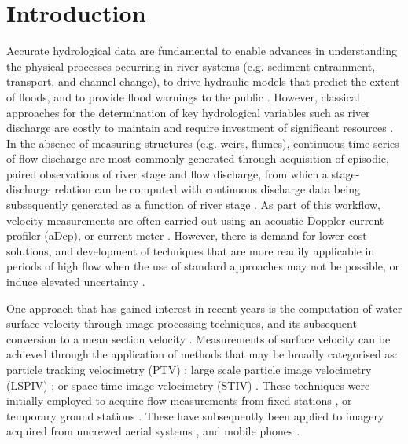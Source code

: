 \documentclass[hess, manuscript]{copernicus} %
\providecommand{\DIFadd}[1]{{\protect\color{blue}\uwave{#1}}} %
\providecommand{\DIFdel}[1]{{\protect\color{red}\sout{#1}}} %
\providecommand{\DIFaddbegin}{} %
\providecommand{\DIFaddend}{} %
\providecommand{\DIFdelbegin}{} %
\providecommand{\DIFdelend}{} %
\newcommand{\DIFscaledelfig}{0.5}
\newlength{\DIFdelgraphicswidth} %
\newlength{\DIFdelgraphicsheight} %
\newcommand{\DIFaddincludegraphics}[2][]{{\color{blue}\fbox{\DIFOincludegraphics[#1]{#2}}}} %
\newcommand{\DIFdelincludegraphics}[2][]{%
\sbox{\DIFdelgraphicsbox}{\DIFOincludegraphics[#1]{#2}}%
\settoboxwidth{\DIFdelgraphicswidth}{\DIFdelgraphicsbox} %
\settoboxtotalheight{\DIFdelgraphicsheight}{\DIFdelgraphicsbox} %
\scalebox{\DIFscaledelfig}{%
\parbox[b]{\DIFdelgraphicswidth}{\usebox{\DIFdelgraphicsbox}\\[-\baselineskip] \rule{\DIFdelgraphicswidth}{0em}}\llap{\resizebox{\DIFdelgraphicswidth}{\DIFdelgraphicsheight}{%
\setlength{\unitlength}{\DIFdelgraphicswidth}%
\begin{picture}(1,1)%
\thicklines\linethickness{2pt} %
{\color[rgb]{1,0,0}\put(0,0){\framebox(1,1){}}}%
{\color[rgb]{1,0,0}\put(0,0){\line( 1,1){1}}}%
{\color[rgb]{1,0,0}\put(0,1){\line(1,-1){1}}}%
\end{picture}%
}\hspace*{3pt}}} %
} %
\DeclareRobustCommand{\DIFaddbegin}{\DIFOaddbegin \let\includegraphics\DIFaddincludegraphics} %
\DeclareRobustCommand{\DIFaddend}{\DIFOaddend \let\includegraphics\DIFOincludegraphics} %
\DeclareRobustCommand{\DIFdelbegin}{\DIFOdelbegin \let\includegraphics\DIFdelincludegraphics} %
\DeclareRobustCommand{\DIFdelend}{\DIFOaddend \let\includegraphics\DIFOincludegraphics} %
\begin{document}
\section{Introduction}
Accurate hydrological data are fundamental to enable advances in understanding the physical processes occurring in river systems (e.g. sediment entrainment, transport, and channel change), to drive hydraulic models that predict the extent of floods, and to provide flood warnings to the public \citep{McMillan2017,Tauro2018}. However, classical approaches for the determination of key hydrological variables such as river discharge are costly to maintain and require investment of significant resources \citep{Fekete2007}. In the absence of measuring structures (e.g. weirs, flumes), continuous time-series of flow discharge are most commonly generated through acquisition of episodic, paired observations of river stage and flow discharge, from which a stage-discharge relation can be computed with continuous discharge data being subsequently generated as a function of river stage \citep{Kiang2018}. As part of this workflow, velocity measurements are often carried out using an acoustic Doppler current profiler (aDcp), or current meter \citep{Herschy2014}. However, there is demand for lower cost solutions, and development of techniques that are more readily applicable in periods of high flow when the use of standard approaches may not be possible, or induce elevated uncertainty \citep{Kidson2005, Baldassarre2009}. 

One approach that has gained interest in recent years is the computation of water surface velocity through image-processing techniques, and its subsequent conversion to a mean section velocity \citep{Jolley2021}. Measurements of surface velocity can be achieved through the application of \DIFdelbegin \DIFdel{methods }\DIFdelend \DIFaddbegin \DIFadd{existing algorithms }\DIFaddend that may be broadly categorised as: particle tracking velocimetry (PTV) \citep{Brevis2011,Tauro2017b}; large scale particle image velocimetry (LSPIV) \citep{Fujita1998, Muste2008}; or space-time image velocimetry (STIV) \citep{Fujita2007}. These techniques were initially employed to acquire flow measurements from fixed stations \citep{Bradley2002,Hauet2008,Stumpf2016}, or temporary ground stations \citep{Jodeau2008, Kim2008, Dramais2011}. These have subsequently been applied to imagery acquired from uncrewed aerial systems \citep[e.g., ][]{Lewis2018, Masafu2022}, and mobile phones \citep[e.g., DischargeApp; ][]{Haro2021}. 
\end{document}
